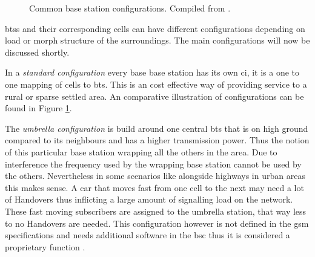 \begin{figure}
	\caption{Common base station configurations. Compiled from \cite{protocols1999}.}
	\label{fig:configurations}
\end{figure}

\glspl{bts} and their corresponding cells can have different configurations depending on load or morph structure of the surroundings.
The main configurations will now be discussed shortly.

In a \emph{standard configuration} every base base station has its own \gls{ci}, it is a one to one mapping of cells to \gls{bts}.
This is an cost effective way of providing service to a rural or sparse settled area.
An comparative illustration of configurations can be found in Figure \ref{fig:configurations}.

The \emph{umbrella configuration} is build around one central \gls{bts} that is on high ground compared to its neighbours and has a higher transmission power.
Thus the notion of this particular base station wrapping all the others in the area.
Due to interference the frequency used by the wrapping base station cannot be used by the others.
Nevertheless in some scenarios like alongside highways in urban areas this makes sense.
A car that moves fast from one cell to the next may need a lot of Handovers thus inflicting a large amount of signalling load on the network.
These fast moving subscribers are assigned to the umbrella station, that way less to no Handovers are needed.
This configuration however is not defined in the \gls{gsm} specifications and needs additional software in the \gls{bsc} thus it is considered a proprietary function \cite{protocols1999}.

